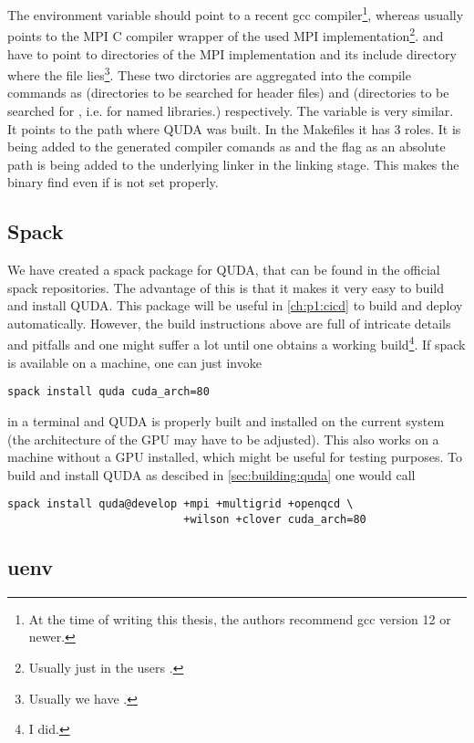 The environment variable  should point to a recent gcc compiler\footnote{At the time of writing this thesis, the authors recommend gcc version 12 or newer.}, whereas  usually points to the MPI C compiler wrapper of the used MPI implementation\footnote{Usually just  in the users .}.  and  have to point to directories of the MPI implementation and its include directory where the file  lies\footnote{Usually we have .}. These two dirctories are aggregated into the compile commands as  (directories to be searched for header files) and  (directories to be searched for , i.e. for named libraries.) respectively. The variable  is very similar. It points to the path where QUDA was built. In the Makefiles it has 3 roles. It is being added to the generated compiler comands as  and the flag  as an absolute path is being added to the underlying linker in the linking stage. This makes the binary find  even if  is not set properly.



\subsection{Spack}

We have created a spack package for QUDA, that can be found in the official spack repositories\cite{spack:quda}. The advantage of this is that it makes it very easy to build and install QUDA. This package will be useful in \cref{ch:p1:cicd} to build and deploy automatically. However, the build instructions above are full of intricate details and pitfalls and one might suffer a lot until one obtains a working build\footnote{I did.}. If spack is available on a machine, one can just invoke
\begin{verbatim}
spack install quda cuda_arch=80
\end{verbatim}
in a terminal and QUDA is properly built and installed on the current system (the architecture  of the GPU may have to be adjusted). This also works on a machine without a GPU installed, which might be useful for testing purposes. To build and install QUDA as descibed in \cref{sec:building:quda} one would call
\begin{verbatim}
spack install quda@develop +mpi +multigrid +openqcd \
                           +wilson +clover cuda_arch=80
\end{verbatim}


\subsection{uenv}

\label{sec:building:uenv}

